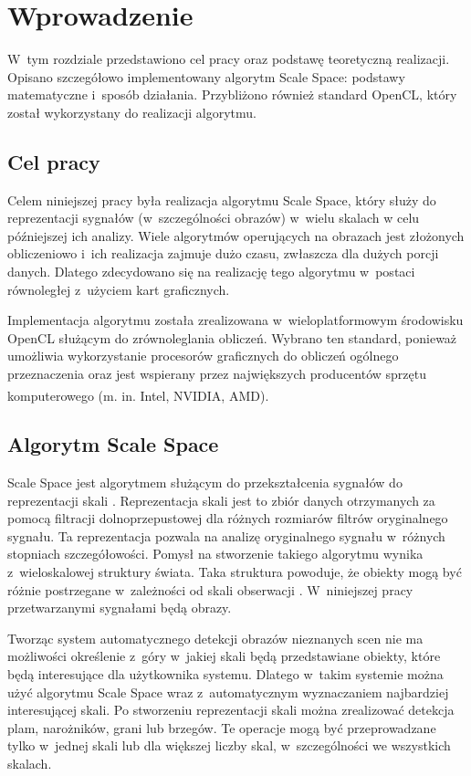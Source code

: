\chapter{Wprowadzenie}
\label{cha:wprowadzenie}

W~tym rozdziale przedstawiono cel pracy oraz podstawę teoretyczną realizacji. Opisano szczegółowo implementowany algorytm Scale Space: podstawy matematyczne i~sposób działania. Przybliżono również standard OpenCL, który został wykorzystany do realizacji algorytmu.


\section{Cel pracy}
\label{sec:cel}
Celem niniejszej pracy była realizacja algorytmu Scale Space, który służy do reprezentacji sygnałów (w~szczególności obrazów) w~wielu skalach w celu późniejszej ich analizy.
Wiele algorytmów operujących na obrazach jest złożonych obliczeniowo i~ich realizacja zajmuje dużo czasu, zwłaszcza dla dużych porcji danych. Dlatego zdecydowano się na realizację tego algorytmu w~postaci równoległej z~użyciem kart graficznych.

Implementacja algorytmu została zrealizowana w~wieloplatformowym środowisku OpenCL \cite{OpenCL} służącym do zrównoleglania obliczeń. Wybrano ten standard, ponieważ umożliwia wykorzystanie procesorów graficznych do obliczeń ogólnego przeznaczenia oraz jest wspierany przez największych producentów sprzętu komputerowego (m. in. Intel\textsuperscript{\textregistered}, NVIDIA\textsuperscript{\texttrademark}, AMD).

\section{Algorytm Scale Space}
\label{sec:algorytm}
Scale Space jest algorytmem służącym do przekształcenia sygnałów do reprezentacji skali \cite{SSFramework}. Reprezentacja skali jest to zbiór danych otrzymanych za pomocą filtracji dolnoprzepustowej dla różnych rozmiarów filtrów oryginalnego sygnału.
Ta reprezentacja pozwala na analizę oryginalnego sygnału w~różnych stopniach szczegółowości.
Pomysł na stworzenie takiego algorytmu wynika z~wieloskalowej struktury świata. Taka struktura powoduje, że obiekty mogą być różnie postrzegane w~zależności od skali obserwacji \cite{Enc09}.
W~niniejszej pracy przetwarzanymi sygnałami będą obrazy.

Tworząc system automatycznego detekcji obrazów nieznanych scen nie ma możliwości określenie z~góry w~jakiej skali będą przedstawiane obiekty, które będą interesujące dla użytkownika systemu. Dlatego w~takim systemie można użyć algorytmu Scale Space wraz z~automatycznym wyznaczaniem najbardziej interesującej skali. Po stworzeniu reprezentacji skali można zrealizować detekcja plam, narożników, grani lub brzegów. Te operacje mogą być przeprowadzane tylko w~jednej skali lub dla większej liczby skal, w~szczególności we wszystkich skalach.

